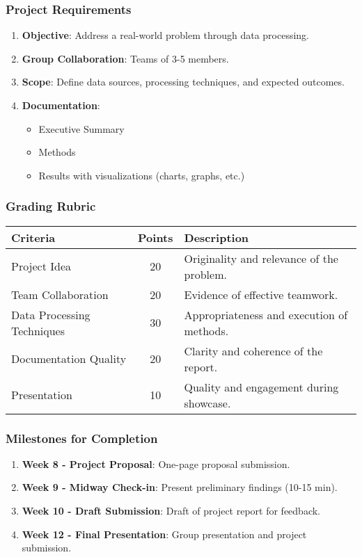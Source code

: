 \documentclass[aspectratio=169]{beamer}
\begin{document}
\begin{frame}[fragile]
    \frametitle{Project Requirements}
    \begin{enumerate}
        \item \textbf{Objective}: Address a real-world problem through data processing.
        \item \textbf{Group Collaboration}: Teams of 3-5 members.
        \item \textbf{Scope}: Define data sources, processing techniques, and expected outcomes.
        \item \textbf{Documentation}: 
        \begin{itemize}
            \item Executive Summary
            \item Methods
            \item Results with visualizations (charts, graphs, etc.)
        \end{itemize}
    \end{enumerate}
\end{frame}

\begin{frame}[fragile]
    \frametitle{Grading Rubric}
    \begin{tabular}{|l|c|l|}
        \hline
        \textbf{Criteria} & \textbf{Points} & \textbf{Description} \\
        \hline
        Project Idea & 20 & Originality and relevance of the problem. \\
        Team Collaboration & 20 & Evidence of effective teamwork. \\
        Data Processing Techniques & 30 & Appropriateness and execution of methods. \\
        Documentation Quality & 20 & Clarity and coherence of the report. \\
        Presentation & 10 & Quality and engagement during showcase. \\
        \hline
    \end{tabular}
\end{frame}

\begin{frame}[fragile]
    \frametitle{Milestones for Completion}
    \begin{enumerate}
        \item \textbf{Week 8 - Project Proposal}: One-page proposal submission.
        \item \textbf{Week 9 - Midway Check-in}: Present preliminary findings (10-15 min).
        \item \textbf{Week 10 - Draft Submission}: Draft of project report for feedback.
        \item \textbf{Week 12 - Final Presentation}: Group presentation and project submission.
    \end{enumerate}
\end{frame}
\end{document}
